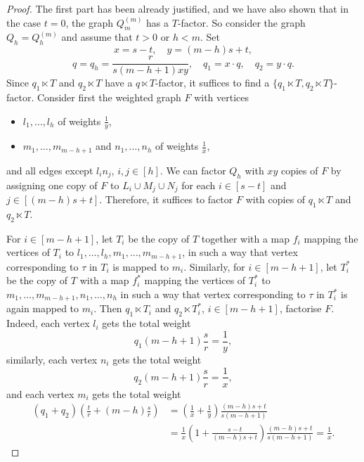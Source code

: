 \documentclass[reqno, 12pt]{amsart}
\numberwithin{equation}{section}
\numberwithin{figure}{section}
\theoremstyle{plain}
\theoremstyle{definition}
\begin{document}
    \begin{proof}
    The first part has been already justified, and we have also shown that in the case $t=0$, the graph $Q_m^{(m)}$ has a $T$-factor.
    So consider the graph $Q_h=Q_h^{(m)}$ and assume that $t>0$ or $h<m$. Set \begin{equation*}
        x=s-t, \quad y=(m-h)s+t,
    \end{equation*} 
    \begin{equation*}
        q=q_h=\frac{r}{s(m-h+1)xy}, \quad q_1=x\cdot q,\quad q_2=y\cdot q.    
    \end{equation*} 
    Since $q_1\ltimes T$ and $q_2\ltimes T$ have a $q\ltimes T$-factor, it suffices to find a $\{q_1\ltimes T, q_2\ltimes T\}$-factor.
        Consider first the weighted graph $F$ with vertices
        \begin{itemize}
            \item $l_1,\dots,l_h$ of weights $\frac 1y$,
            \item $m_1,\dots, m_{m-h+1}$ and $n_1,\dots,n_h$ of weights $\frac 1x$,
        \end{itemize}
        and all edges except $l_in_j$, $i,j \in [h]$.
        We can factor $Q_h$ with $xy$ copies of $F$ by assigning one copy of $F$ to $L_i\cup M_j \cup N_j$ for each $i\in [s-t]$ and $j\in [(m-h)s+t]$. 
        Therefore, it suffices to factor $F$ with copies of $q_1\ltimes T$ and $q_2\ltimes T$. 
        
        For $i\in[m-h+1]$, let $T_i$ be the copy of $T$ together with a map $f_i$ mapping the vertices of $T_i$ to $l_1,\dots, l_h,m_1,\dots ,m_{m-h+1}$, in such a way that vertex corresponding to $\tau$ in $T_i$ is mapped to $m_i$. Similarly, for $i\in[m-h+1]$, let $T_i^*$ be the copy of $T$ with a map $f_i^*$ mapping the vertices of $T_i^*$  to $m_1,\dots ,m_{m-h+1},n_1,\dots ,n_h$ in such a way that vertex corresponding to $\tau$ in $T_i^*$ is again mapped to $m_i$. 
        Then $q_1\ltimes T_i$ and $q_2\ltimes T_i^*$, $i\in[m-h+1]$, factorise $F$. Indeed, each vertex $l_i$ gets the total weight
        \[ q_1(m-h+1)\frac{s}{r} = \frac1y,\]
        similarly, each vertex $n_i$ gets the total weight
        \[ q_2(m-h+1)\frac{s}{r} = \frac1x,\]
        and each vertex $m_i$ gets the total weight
        \begin{align*} 
        (q_1+q_2)\left(\frac{t}{r} + (m-h)\frac{s}{r}\right) & = \left(\frac{1}{x}+\frac{1}{y}\right) \frac{(m-h)s+t}{s(m-h+1)} \\
        & = \frac{1}{x}\left(1+ \frac{s-t}{(m-h)s+t}\right)\frac{(m-h)s+t}{s(m-h+1)} = \frac1x.
        \end{align*}
    \end{proof}
    
\end{document}
